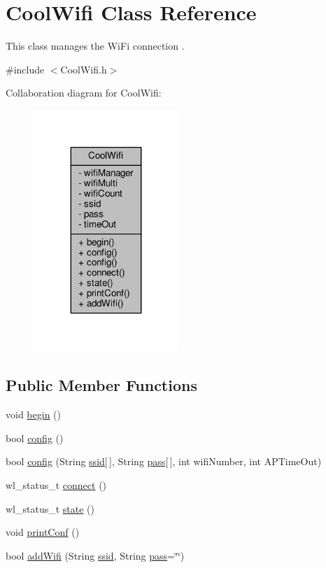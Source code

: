 \hypertarget{classCoolWifi}{}\section{Cool\+Wifi Class Reference}
\label{classCoolWifi}


This class manages the Wi\+Fi connection .  




{\ttfamily \#include $<$Cool\+Wifi.\+h$>$}



Collaboration diagram for Cool\+Wifi\+:
\nopagebreak
\begin{figure}[H]
\begin{center}
\leavevmode
\includegraphics[width=155pt]{classCoolWifi__coll__graph}
\end{center}
\end{figure}
\subsection*{Public Member Functions}
\begin{DoxyCompactItemize}
\item 
void \hyperlink{classCoolWifi_a46942fed90e475112cc10b78a32e7aaa}{begin} ()
\item 
bool \hyperlink{classCoolWifi_a4eb2f6b9b09dd588964b88b6c70122c0}{config} ()
\item 
bool \hyperlink{classCoolWifi_a871d4a0d9978f17fdf6d874fc2958b6c}{config} (String \hyperlink{classCoolWifi_a893b21d0fed821438733bba2e73fb4c2}{ssid}\mbox{[}$\,$\mbox{]}, String \hyperlink{classCoolWifi_a0c3332a149245aaad060b32593a54c9b}{pass}\mbox{[}$\,$\mbox{]}, int wifi\+Number, int A\+P\+Time\+Out)
\item 
wl\+\_\+status\+\_\+t \hyperlink{classCoolWifi_ad060353050f40d032a2dbf9e54a768bf}{connect} ()
\item 
wl\+\_\+status\+\_\+t \hyperlink{classCoolWifi_a1c7b4d82a4098d346e7593dce92039fa}{state} ()
\item 
void \hyperlink{classCoolWifi_a9e6105c6d13d35ec510f6633da9e0223}{print\+Conf} ()
\item 
bool \hyperlink{classCoolWifi_a914d7a1df14dd6b75345fb614c34e9d6}{add\+Wifi} (String \hyperlink{classCoolWifi_a893b21d0fed821438733bba2e73fb4c2}{ssid}, String \hyperlink{classCoolWifi_a0c3332a149245aaad060b32593a54c9b}{pass}=\char`\"{}\char`\"{})
\end{DoxyCompactItemize}
